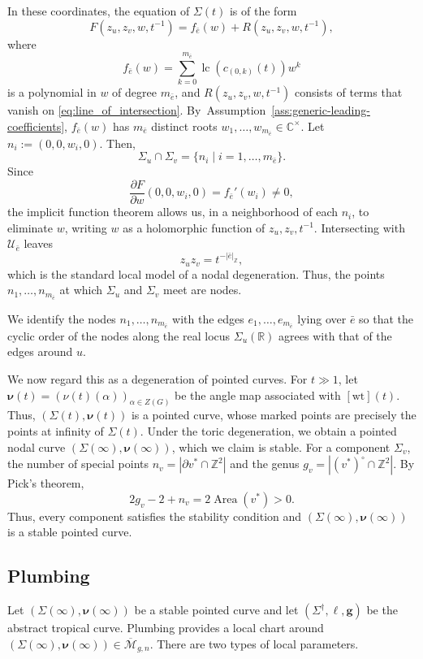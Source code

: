 \documentclass[12pt]{amsart}
\numberwithin{equation}{section}
\theoremstyle{definition}
\newcommand{\Z}{\mathbb{Z}}
\newcommand{\C}{\mathbb{C}}
\newcommand{\R}{\mathbb{R}}
\newcommand{\wt}{\mathrm{wt}}
\def\trop{\dagger}
\def\lc{\operatorname{lc}}
\def\zzG{{{Z}(G)}}
\def\spectralcurve{\Sigma}
\def\degeneratecurve{\Sigma(\infty)}
\def\mcurve{\Sigma}
\def\tropmcurve{\mcurve^\trop}
\begin{document}
In these coordinates, the equation of $\spectralcurve(t)$ is of the
form
\[
F(z_u,z_v,w,t^{-1})
=
f_{\bar e}(w)+R(z_u,z_v,w,t^{-1}),
\]
where
\[
f_{\bar e}(w)
=
\sum_{k=0}^{m_{\bar e}}
\lc(c_{(0,k)}(t))w^k
\]
is a polynomial in $w$ of degree $m_{\bar e}$, and
$R(z_u,z_v,w,t^{-1})$ consists of terms that vanish on
\eqref{eq:line_of_intersection}. By~Assumption~\ref{ass:generic-leading-coefficients},
$f_{\bar e}(w)$ has $m_{\bar e}$ distinct roots
$
w_1,\dots,w_{m_{\bar e}}\in\C^\times.
$
Let $n_i :=(0,0,w_i,0)$. Then,
\[
\spectralcurve_u\cap\spectralcurve_v
=
\{
n_i
\mid
i=1,\dots,m_{\bar e}
\}.
\]
Since
\[
\frac{\partial F}{\partial w}(0,0,w_i,0)
=
f_{\bar e}'(w_i)
\neq0,
\]
the implicit function theorem allows us, in a neighborhood of each
$n_i$, to eliminate $w$, writing $w$ as a holomorphic function of
$z_u,z_v,t^{-1}$. Intersecting with $\mathcal U_{\bar e}$ leaves
\[
z_uz_v
=
t^{-|\bar e|_{\Z}},
\]
which is the standard local model of a nodal degeneration. Thus, the points $n_1,\dots,n_{m_{\bar e}}$ at which $\spectralcurve_u$ and $\spectralcurve_v$ meet are nodes.


We identify the nodes $n_1,\dots,n_{m_{\bar e}}$ with the edges $e_1,\dots,e_{m_{\bar e}}$ lying over $\bar e$ so that the cyclic order of the nodes along the real locus $\mcurve_u(\R)$ agrees with that of the edges around $u$.



We now regard this as a degeneration of pointed curves. For
\(t\gg 1\), let
\(
\bm\nu(t)=(\nu(t)(\alpha))_{\alpha\in\zzG}
\)
be the angle map associated with \([\wt](t)\). Thus,
$
(\spectralcurve(t),\bm\nu(t))
$
is a pointed curve, whose marked points are precisely the points at
infinity of \(\spectralcurve(t)\). Under the toric degeneration, we obtain a pointed nodal curve
$
(\degeneratecurve,\bm\nu(\infty))$, which we claim is stable. For a component
\(\spectralcurve_v\), the number of
special points 
$
n_v
=
\left|\partial v^*\cap\Z^2\right|
$
and the genus
$
g_v
=
\left|(v^*)^\circ\cap\Z^2\right|.
$ By Pick's theorem,
\[
2g_v-2+n_v
=
2\operatorname{Area}(v^*)
>
0.
\]
Thus, every component satisfies the stability condition and
$
(\degeneratecurve,\bm\nu(\infty))
$
is a stable pointed curve.




\subsection{Plumbing}

Let
$
(\degeneratecurve,\bm\nu(\infty))
$
be a stable pointed curve and let $(\tropmcurve,\ell,\bm g)$ be the abstract tropical curve. Plumbing provides a local chart around
$
(\degeneratecurve,\bm\nu(\infty))
\in
\overline{\mathcal M}_{g,n}
$. There are two types of local parameters.
\end{document}
